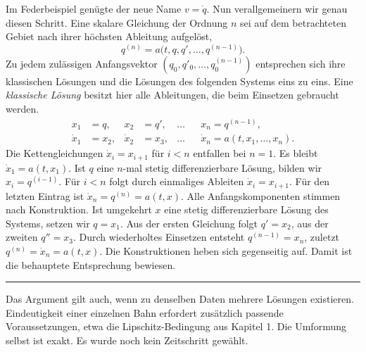 Im Federbeispiel genügte der neue Name \(v=\dot q\). Nun verallgemeinern wir genau diesen Schritt. Eine skalare Gleichung der Ordnung \(n\) sei auf dem betrachteten Gebiet nach ihrer höchsten Ableitung aufgelöst,
\[
 q^{(n)}=a\bigl(t,q,q',\ldots,q^{(n-1)}\bigr).
\]
Zu jedem zulässigen Anfangsvektor \((q_0,q'_0,\ldots,q^{(n-1)}_0)\) entsprechen sich ihre klassischen Lösungen und die Lösungen des folgenden Systems eins zu eins. Eine \emph{klassische Lösung} besitzt hier alle Ableitungen, die beim Einsetzen gebraucht werden.
\[
 \begin{aligned}
 x_1&=q,& x_2&=q',&\ldots&&x_n=q^{(n-1)},\\
 \dot x_1&=x_2,&\dot x_2&=x_3,&\ldots&&\dot x_n=a(t,x_1,\ldots,x_n).
 \end{aligned}
\]
Die Kettengleichungen \(\dot x_i=x_{i+1}\) für \(i<n\) entfallen bei \(n=1\). Es bleibt \(\dot x_1=a(t,x_1)\).
Ist \(q\) eine \(n\)-mal stetig differenzierbare Lösung, bilden wir \(x_i=q^{(i-1)}\). Für \(i<n\) folgt durch einmaliges Ableiten \(\dot x_i=x_{i+1}\). Für den letzten Eintrag ist \(\dot x_n=q^{(n)}=a(t,x)\). Alle Anfangskomponenten stimmen nach Konstruktion.
Ist umgekehrt \(x\) eine stetig differenzierbare Lösung des Systems, setzen wir \(q=x_1\). Aus der ersten Gleichung folgt \(q'=x_2\), aus der zweiten \(q''=x_3\). Durch wiederholtes Einsetzen entsteht \(q^{(n-1)}=x_n\), zuletzt \(q^{(n)}=\dot x_n=a(t,x)\). Die Konstruktionen heben sich gegenseitig auf. Damit ist die behauptete Entsprechung bewiesen. \hfill{\color{sea}\rule{4pt}{4pt}}

Das Argument gilt auch, wenn zu denselben Daten mehrere Lösungen existieren. Eindeutigkeit einer einzelnen Bahn erfordert zusätzlich passende Voraussetzungen, etwa die Lipschitz-Bedingung aus Kapitel 1. Die Umformung selbst ist exakt. Es wurde noch kein Zeitschritt gewählt.


